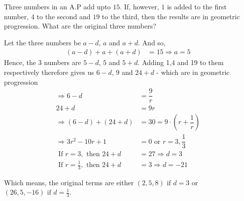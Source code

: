 

\question[4] Three numbers in an A.P add upto $15$. If, however, $1$ is added to the first number,
$4$ to the second and $19$ to the third, then the results are in geometric progression. What are 
the original three numbers?


\ifprintanswers

\fi 

\begin{solution}[\halfpage]
	Let the three numbers be $a-d$, $a$ and $a+d$. And so,
	\begin{align}
		(a-d) + a + (a+d) &= 15 \Rightarrow a = 5
	\end{align}
	Hence, the 3 numbers are $5-d$, $5$ and $5+d$. Adding 1,4 and 19 to them respectively therefore gives us
	$6-d$, $9$ and $24+d$ - which are in geometric progression
	\begin{align}
		\Rightarrow 6-d &= \dfrac{9}{r} \\
		24+d &= 9r \\
		\Rightarrow (6-d) + (24+d) &= 30 = 9\cdot\left( r + \dfrac{1}{r}\right) \\
		\Rightarrow 3r^2 - 10r + 1 &= 0 \text{ or } r = 3, \dfrac{1}{3} \\
		\text{ If } r = 3, \text{ then } 24 + d &= 27 \Rightarrow d = 3 \\
		\text{ If } r = \frac{1}{3}, \text{ then } 24 + d &= 3 \Rightarrow d = -21
	\end{align}
	
	Which means, the original terms are either $(2,5,8) \text{ if } d = 3$ or $(26,5,-16) \text{ if } d = \frac{1}{3}$.	
\end{solution}
